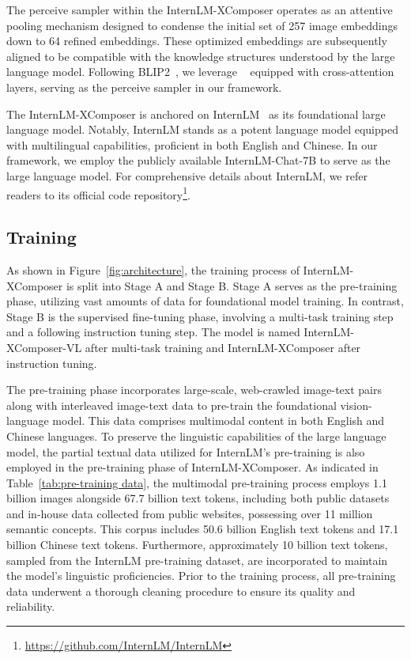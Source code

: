 \documentclass[10pt,twocolumn,letterpaper]{article}
\begin{document}
 The perceive sampler within the InternLM-XComposer operates as an attentive pooling mechanism designed to condense the initial set of 257 image embeddings down to 64 refined embeddings. These optimized embeddings are subsequently aligned to be compatible with the knowledge structures understood by the large language model. Following BLIP2~\cite{Li2023BLIP2BL}, we leverage ~\cite{devlin2018bert} equipped with cross-attention layers, serving as the perceive sampler in our framework.

 The InternLM-XComposer is anchored on InternLM~\cite{2023internlm} as its foundational large language model. Notably, InternLM stands as a potent language model equipped with multilingual capabilities, proficient in both English and Chinese. In our framework, we employ the publicly available InternLM-Chat-7B to serve as the large language model. For comprehensive details about InternLM, we refer readers to its official code repository\footnote{\url{https://github.com/InternLM/InternLM}}.

\subsection{Training}
As shown in Figure~\ref{fig:architecture}, the training process of InternLM-XComposer is split into Stage A and Stage B. Stage A serves as the pre-training phase, utilizing vast amounts of data for foundational model training. 
In contrast, Stage B is the supervised fine-tuning phase, involving a multi-task training step and a following instruction tuning step. 
The model is named InternLM-XComposer-VL after multi-task training and InternLM-XComposer after instruction tuning.

 The pre-training phase incorporates large-scale, web-crawled image-text pairs along with interleaved image-text data to pre-train the foundational vision-language model. This data comprises multimodal content in both English and Chinese languages. To preserve the linguistic capabilities of the large language model, the partial textual data utilized for InternLM's pre-training is also employed in the pre-training phase of InternLM-XComposer. As indicated in Table~\ref{tab:pre-training data}, the multimodal pre-training process employs 1.1 billion images alongside 67.7 billion text tokens, including both public datasets and in-house data collected from public websites, possessing over 11 million semantic concepts. This corpus includes 50.6 billion English text tokens and 17.1 billion Chinese text tokens. Furthermore, approximately 10 billion text tokens, sampled from the InternLM pre-training dataset, are incorporated to maintain the model's linguistic proficiencies. Prior to the training process, all pre-training data underwent a thorough cleaning procedure to ensure its quality and reliability.
\end{document}
